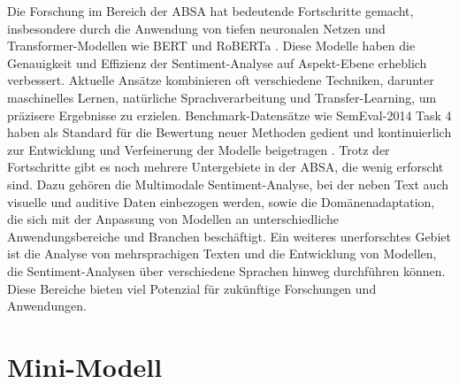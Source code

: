 \documentclass[12pt]{article}
\begin{document}
Die Forschung im Bereich der ABSA hat bedeutende Fortschritte gemacht, insbesondere durch die Anwendung von tiefen neuronalen Netzen und 
Transformer-Modellen wie BERT und RoBERTa \cite{liu2019roberta}. Diese Modelle haben die Genauigkeit und Effizienz der Sentiment-Analyse auf Aspekt-Ebene erheblich 
verbessert. Aktuelle Ansätze kombinieren oft verschiedene Techniken, darunter maschinelles Lernen, natürliche Sprachverarbeitung und Transfer-Learning, 
um präzisere Ergebnisse zu erzielen. Benchmark-Datensätze wie SemEval-2014 Task 4 haben als Standard für die Bewertung neuer Methoden gedient und 
kontinuierlich zur Entwicklung und Verfeinerung der Modelle beigetragen \cite{pontiki2014semeval}.
\newline
\newline
Trotz der Fortschritte gibt es noch mehrere Untergebiete in der ABSA, die wenig erforscht sind. Dazu gehören die Multimodale Sentiment-Analyse, bei der 
neben Text auch visuelle und auditive Daten einbezogen werden, sowie die Domänenadaptation, die sich mit der Anpassung von Modellen an unterschiedliche 
Anwendungsbereiche und Branchen beschäftigt. Ein weiteres unerforschtes Gebiet ist die Analyse von mehrsprachigen Texten und die Entwicklung von 
Modellen, die Sentiment-Analysen über verschiedene Sprachen hinweg durchführen können. Diese Bereiche bieten viel Potenzial für zukünftige Forschungen 
und Anwendungen.

\section{Mini-Modell}
\end{document}
